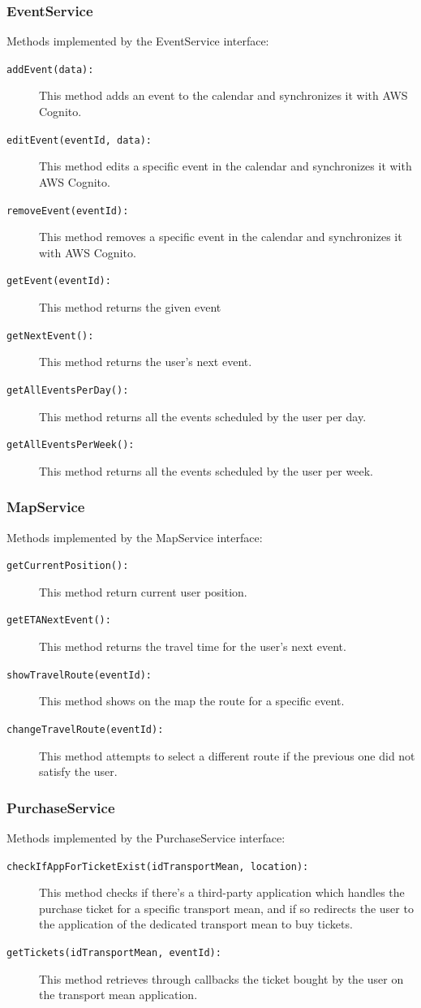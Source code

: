 \subsubsection*{EventService}
Methods implemented by the EventService interface:
\begin{description}
\item[\texttt{addEvent(data):}] This method adds an event to the calendar and synchronizes it with AWS Cognito.
\item[\texttt{editEvent(eventId, data):}] This method edits a specific event in the calendar and synchronizes it with AWS Cognito.
\item[\texttt{removeEvent(eventId):}] This method removes a specific event in the calendar and synchronizes it with AWS Cognito.
\item[\texttt{getEvent(eventId):}] This method returns the given event
\item[\texttt{getNextEvent():}] This method returns the user's next event.
\item[\texttt{getAllEventsPerDay():}] This method returns all the events scheduled by the user per day.
\item[\texttt{getAllEventsPerWeek():}] This method returns all the events scheduled by the user per week.
\end{description}

\subsubsection*{MapService}
Methods implemented by the MapService interface:
\begin{description}
\item[\texttt{getCurrentPosition():}] This method return current user position.
\item[\texttt{getETANextEvent():}] This method returns the travel time for the user's next event.
\item[\texttt{showTravelRoute(eventId):}] This method shows on the map the route for a specific event.
\item[\texttt{changeTravelRoute(eventId):}] This method attempts to select a different route if the previous one did not satisfy the user.
\end{description}

\subsubsection*{PurchaseService}
Methods implemented by the PurchaseService interface:
\begin{description}
\item[\texttt{checkIfAppForTicketExist(idTransportMean, location):}] This method checks if there's a third-party application which handles the purchase ticket for a specific transport mean, and if so redirects the user to the application of the dedicated transport mean to buy tickets.
\item[\texttt{getTickets(idTransportMean, eventId):}] This method retrieves through callbacks the ticket bought by the user on the transport mean application.
\end{description}

